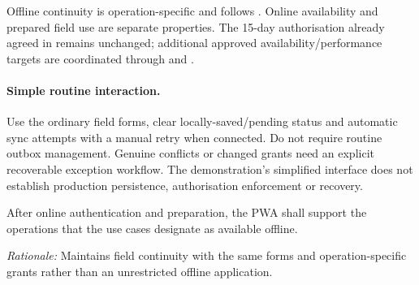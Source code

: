 \label{sec:nfr-offline}
Offline continuity is operation-specific and follows \hyperref[br:013]{}.
Online availability and prepared field use are separate properties. The 15-day
authorisation already agreed in  remains unchanged; additional
approved availability/performance targets are coordinated through 
and .
\paragraph{Simple routine interaction.}\label{sec:offline-interaction}
Use the ordinary field forms, clear locally-saved/pending status and automatic sync
attempts with a manual retry when connected. Do not require routine outbox management.
Genuine conflicts or changed grants need an explicit recoverable exception workflow.
The demonstration's simplified interface does not establish production persistence,
authorisation enforcement or recovery.

\label{nfr:AOC-01}
After online authentication and preparation, the PWA shall support the operations that the use cases designate as available offline.

\textit{Rationale:} Maintains field continuity with the same forms and operation-specific grants rather than an unrestricted offline application.

